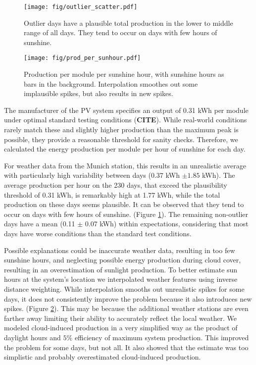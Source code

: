 \documentclass{article}
\begin{document}
\begin{figure}[H]
	\texttt{[image: fig/outlier\_scatter.pdf]}
	\caption{Outlier days have a plausible total production in the lower to middle range of all days. They tend to occur on days with few hours of sunshine.}\label{fig:outlier_scatter}
\end{figure}
\begin{figure}[H]
	\texttt{[image: fig/prod\_per\_sunhour.pdf]}
	\caption{Production per module per sunshine hour, with sunshine hours as bars in the background. Interpolation smoothes out some implausible spikes, but also results in new spikes.}\label{fig:prod_per_hour}
\end{figure}

The manufacturer of the PV system specifies an output of 0.31 kWh per module under optimal standard testing conditions (\textbf{CITE}). While real-world conditions rarely match these and slightly higher production than the maximum peak is possible, they provide a reasonable threshold for sanity checks. Therefore, we calculated the energy production per module per hour of sunshine for each day.

For weather data from the Munich station, this results in an unrealistic average with particularly high variability between days ($0.37$ kWh $\pm 1.85$ kWh). The average production per hour on the 230 days, that exceed the plausibility threshold of 0.31 kWh, is remarkably high at 1.77 kWh, while the total production on these days seems plausible. It can be observed that they tend to occur on days with few hours of sunshine. (Figure \ref{fig:outlier_scatter}).  The remaining non-outlier days have a mean (0.11 $\pm$ 0.07 kWh) within expectations, considering that most days have worse conditions than the standard test conditions. 

Possible explanations could be inaccurate weather data, resulting in too few sunshine hours, and neglecting possible energy production during cloud cover, resulting in an overestimation of sunlight production. To better estimate sun hours at the system's location we interpolated weather features using inverse distance weighting. While interpolation smooths out unrealistic spikes for some days, it does not consistently improve the problem because it also introduces new spikes. (Figure \ref{fig:prod_per_hour}). This may be because the additional weather stations are even farther away limiting their ability to accurately reflect the local weather. We modeled cloud-induced production in a very simplified way as the product of daylight hours and $5\%$ efficiency of maximum system production. This improved the problem for some days, but not all. It also showed that the estimate was too simplistic and probably overestimated cloud-induced production.
\end{document}
